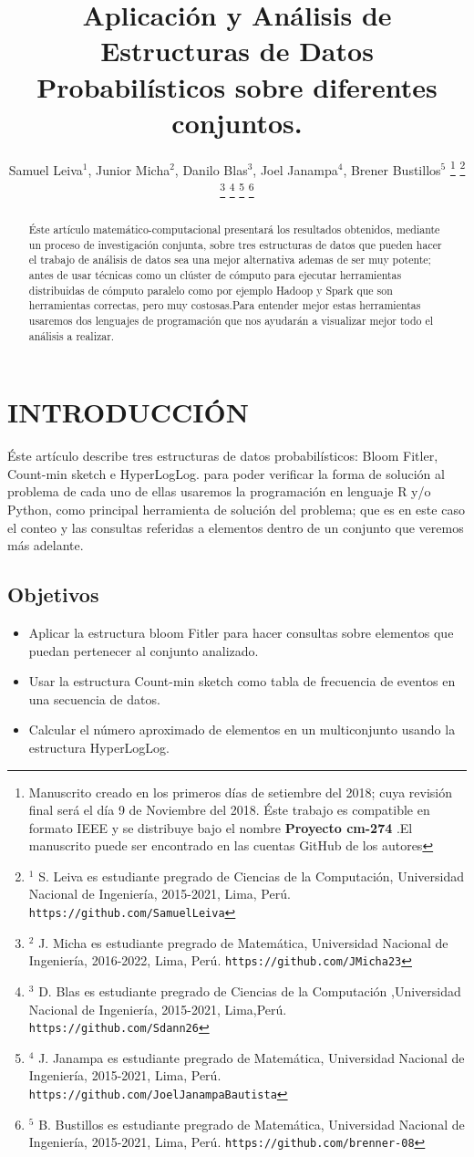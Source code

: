 \documentclass[journal]{IEEEtran}
\title{\LARGE \bf Aplicaci\'on y Análisis de Estructuras de Datos Probabil\'isticos sobre diferentes conjuntos. 
}
\author{Samuel Leiva$^{1}$, Junior Micha$^{2}$, Danilo Blas$^{3}$, Joel Janampa$^{4}$, Brener Bustillos$^{5}$%
\thanks{Manuscrito creado en los primeros d\'ias de setiembre del 2018; cuya revisi\'on final ser\'a el d\'ia 9 de Noviembre del 2018. \'Este trabajo es compatible en formato IEEE y se distribuye bajo el nombre \textbf{Proyecto cm-274} .El manuscrito puede ser encontrado en las cuentas GitHub de los autores}%
\thanks{$^{1}$ S. Leiva es estudiante pregrado de Ciencias de la Computaci\'on, Universidad Nacional de Ingenier\'ia, 2015-2021, Lima, Per\'u.
        {\tt\small https://github.com/SamuelLeiva}}%
\thanks{$^{2}$ J. Micha es estudiante pregrado de Matem\'atica, Universidad Nacional de Ingenier\'ia, 2016-2022, Lima, Per\'u.
        {\tt\small https://github.com/JMicha23}}%
\thanks{$^{3}$ D. Blas es estudiante pregrado de Ciencias de la Computaci\'on ,Universidad Nacional de Ingenier\'ia, 2015-2021, Lima,Per\'u.
        {\tt\small https://github.com/Sdann26}}%
\thanks{$^{4}$ J. Janampa es estudiante pregrado de Matem\'atica, Universidad Nacional de Ingenier\'ia, 2015-2021, Lima, Per\'u.
        {\tt\small https://github.com/JoelJanampaBautista}}%
\thanks{$^{5}$ B. Bustillos es estudiante pregrado de Matem\'atica, Universidad Nacional de Ingenier\'ia, 2015-2021, Lima, Per\'u. 
        {\tt\small https://github.com/brenner-08}}%
}
\begin{document}
\maketitle
\thispagestyle{empty}
\pagestyle{empty}


\begin{abstract}
   
\'Este art\'iculo matem\'atico-computacional presentar\'a los resultados obtenidos, mediante un proceso de investigaci\'on conjunta, sobre tres estructuras de datos que pueden hacer el trabajo de an\'alisis de datos sea una mejor alternativa ademas de ser muy potente; antes de usar t\'ecnicas como un cl\'uster de c\'omputo para ejecutar herramientas distribuidas de c\'omputo paralelo como por ejemplo  Hadoop y Spark que son herramientas correctas, pero muy costosas.Para entender mejor estas herramientas usaremos dos lenguajes de programaci\'on que nos ayudar\'an a visualizar mejor todo el an\'alisis a realizar. 

\end{abstract}


\section{INTRODUCCI\'ON}

\'Este art\'iculo describe tres estructuras de datos probabil\'isticos: Bloom Fitler, Count-min sketch e HyperLogLog. para poder verificar la forma de soluci\'on al problema de cada uno de ellas usaremos la programaci\'on en lenguaje R y/o Python, como principal herramienta de soluci\'on del problema; que es en este caso el conteo y las consultas referidas a elementos dentro de un conjunto que veremos m\'as adelante.

\subsection{Objetivos}

\begin{itemize}
    \item Aplicar la estructura bloom Fitler para hacer consultas sobre elementos que puedan pertenecer al conjunto analizado. 
    \item Usar la estructura Count-min sketch como tabla de frecuencia de eventos en una secuencia de datos.
    \item Calcular el número aproximado de elementos en un multiconjunto usando la estructura HyperLogLog. 
\end{itemize}
\end{document}
